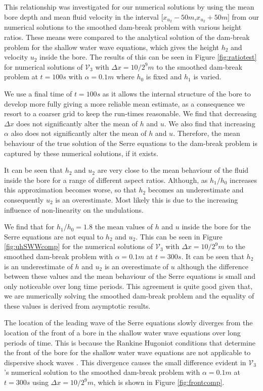 \documentclass[times]{elsarticle}
\begin{document}
This relationship was investigated for our numerical solutions by using the mean bore depth and mean fluid velocity in the interval [$x_{u_2}-50m$,$x_{u_2}+50m$] from our numerical solutions to the smoothed dam-break problem with various height ratios. These means were compared to the analytical solution of the dam-break problem for the shallow water wave equations, which gives the height $h_2$ and velocity $u_2$ inside the bore. The results of this can be seen in Figure \ref{fig:ratiotest} for numerical solutions of $\mathcal{V}_3$ with $\Delta x = 10/2^{9}m$ to the smoothed dam-break problem at $t=100s$ with $\alpha = 0.1m$ where $h_0$ is fixed and $h_1$ is varied.

We use a final time of $t=100s$ as it allows the internal structure of the bore to develop more fully giving a more reliable mean estimate, as a consequence we resort to a coarser grid to keep the run-times reasonable. We find that decreasing $\Delta x$ does not significantly alter the mean of $h$ and $u$. We also find that increasing $\alpha$ also does not significantly alter the mean of $h$ and $u$. Therefore, the mean behaviour of the true solution of the Serre equations to the dam-break problem is captured by these numerical solutions, if it exists.

It can be seen that $h_2$ and $u_2$ are very close to the mean behaviour of the fluid inside the bore for a range of different aspect ratios. Although, as $h_1/h_0$ increases this approximation becomes worse, so that $h_2$ becomes an underestimate and consequently $u_2$ is an overestimate. Most likely this is due to the increasing influence of non-linearity on the undulations. 

We find that for $h_1/h_0 = 1.8$ the mean values of $h$ and $u$ inside the bore for the Serre equations are not equal to $h_2$ and $u_2$. This can be seen in Figure \ref{fig:uhSWWcomp} for the numerical solutions of $\mathcal{V}_3$ with $\Delta x = 10/2^{9}m$ to the smoothed dam-break problem with $\alpha = 0.1m$ at $t=300s$. It can be seen that $h_2$ is an underestimate of $h$ and $u_2$ is an overestimate of $u$ although the difference between these values and the mean behaviour of the Serre equations is small and only noticeable over long time periods. This agreement is quite good given that, we are numerically solving the smoothed dam-break problem and the equality of these values is derived from asymptotic results.

The location of the leading wave of the Serre equations slowly diverges from the location of the front of a bore in the shallow water wave equations over long periods of time. This is because the Rankine Hugoniot conditions that determine the front of the bore for the shallow water wave equations are not applicable to dispersive shock waves \cite{El-Hoefer-2016-11}. This divergence causes the small difference evident in $\mathcal{V}_3$'s numerical solution to the smoothed dam-break problem with $\alpha =0.1m$ at $t=300s$ using $\Delta x = 10/2^{9}m$, which is shown in Figure \ref{fig:frontcomp}.
\end{document}
